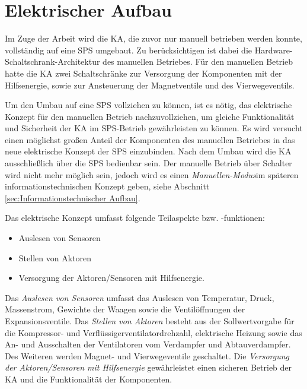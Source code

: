 \section{Elektrischer Aufbau}
\label{sec:Elektrischer Aufbau}
Im Zuge der Arbeit wird die KA, die zuvor nur manuell betrieben werden konnte, vollständig auf eine SPS umgebaut. Zu berücksichtigen ist dabei die Hardware-Schaltschrank-Architektur des manuellen Betriebes. Für den manuellen Betrieb hatte die KA zwei Schaltschränke zur Versorgung der Komponenten mit der Hilfsenergie, sowie zur Ansteuerung der Magnetventile und des Vierwegeventils.

Um den Umbau auf eine SPS vollziehen zu können, ist es nötig, das elektrische Konzept für den manuellen Betrieb nachzuvollziehen, um  gleiche Funktionalität und Sicherheit der KA im SPS-Betrieb gewährleisten zu können. Es wird versucht einen möglichst großen Anteil der Komponenten des manuellen Betriebes  in das neue elektrische Konzept der SPS einzubinden. Nach dem Umbau wird die KA ausschließlich über die SPS bedienbar sein. Der manuelle Betrieb über Schalter wird nicht mehr möglich sein, jedoch wird es einen \textit{Manuellen-Modus}im späteren informationstechnischen Konzept geben, siehe Abschnitt \ref{sec:Informationstechnischer Aufbau}.

Das elektrische Konzept umfasst folgende Teilaspekte bzw. -funktionen:

\begin{itemize}
\item Auslesen von Sensoren
\item Stellen von Aktoren 
\item Versorgung der Aktoren/Sensoren mit Hilfsenergie.
\end{itemize}

Das \textit{Auslesen von Sensoren} umfasst das Auslesen von Temperatur, Druck, Massenstrom, Gewichte der Waagen sowie die Ventilöffnungen der Expansionsventile. Das \textit{Stellen von Aktoren} besteht aus der Sollwertvorgabe für die Kompressor- und Verflüssigerventilatordrehzahl, elektrische Heizung sowie das An- und Ausschalten der Ventilatoren vom Verdampfer und Abtauverdampfer. Des Weiteren werden Magnet- und Vierwegeventile geschaltet. 
Die \textit{Versorgung der Aktoren/Sensoren mit Hilfsenergie} gewährleistet einen sicheren Betrieb der KA und die Funktionalität der Komponenten.  

